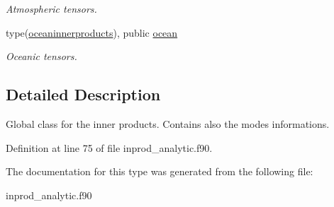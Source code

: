 \begin{DoxyCompactItemize}
\begin{DoxyCompactList}\small\item\em Atmospheric tensors. \end{DoxyCompactList}\item 
\mbox{\label{structinprod__analytic_1_1innerproducts_a349a38f433c62a09f3f4cd9720bdea14}} 
type(\hyperlink{structinprod__analytic_1_1oceaninnerproducts}{oceaninnerproducts}), public \hyperlink{structinprod__analytic_1_1innerproducts_a349a38f433c62a09f3f4cd9720bdea14}{ocean}
\begin{DoxyCompactList}\small\item\em Oceanic tensors. \end{DoxyCompactList}\end{DoxyCompactItemize}


\subsection{Detailed Description}
Global class for the inner products. Contains also the modes informations. 

Definition at line 75 of file inprod\+\_\+analytic.\+f90.



The documentation for this type was generated from the following file\+:\begin{DoxyCompactItemize}
\item 
inprod\+\_\+analytic.\+f90\end{DoxyCompactItemize}
